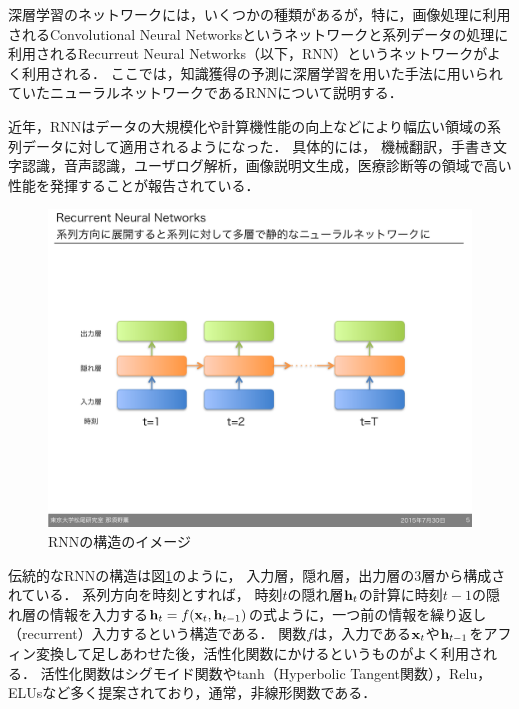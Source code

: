 深層学習のネットワークには，いくつかの種類があるが，特に，画像処理に利用されるConvolutional Neural Networks\cite{lecun1998gradient}というネットワークと系列データの処理に利用されるRecurreut Neural Networks\cite{williams1989learning}（以下，RNN）というネットワークがよく利用される．
ここでは，知識獲得の予測に深層学習を用いた手法\cite{piech2015deep}に用いられていたニューラルネットワークであるRNNについて説明する．


近年，RNNはデータの大規模化や計算機性能の向上などにより幅広い領域の系列データに対して適用されるようになった．
具体的には，
機械翻訳\cite{sutskever2014sequence, dong2015multi}，手書き文字認識\cite{graves2009offline,louradour2014curriculum}，音声認識\cite{hinton2012deep,bahdanau2015end}，ユーザログ解析\cite{hidasi2015session}，画像説明文生成\cite{xu2015show,vinyals2014show}，医療診断\cite{choi2015doctor,lipton2015learning}等の領域で高い性能を発揮することが報告されている．

\begin{figure}[htb]
\begin{center}
\includegraphics[width=350pt]{./img/RNN4.pdf}
\end{center}
\caption{RNNの構造のイメージ}
\label{fig:RNN}
\end{figure}
伝統的なRNNの構造は図\ref{fig:RNN}のように，
入力層，隠れ層，出力層の3層から構成されている．
系列方向を時刻とすれば，
時刻$t$の隠れ層${\bf h}_t$の計算に時刻$t-1$の隠れ層の情報を入力する${\bf h}_t = f({\bf x}_t, {\bf h}_{t-1})$の式ように，一つ前の情報を繰り返し（recurrent）入力するという構造である．
関数$f$は，入力である${\bf x}_t$や${\bf h}_{t-1}$をアフィン変換して足しあわせた後，活性化関数にかけるというものがよく利用される．
活性化関数はシグモイド関数やtanh（Hyperbolic Tangent関数），Relu\cite{nair2010rectified}，ELUs\cite{clevert2015fast}など多く提案されており，通常，非線形関数である．



